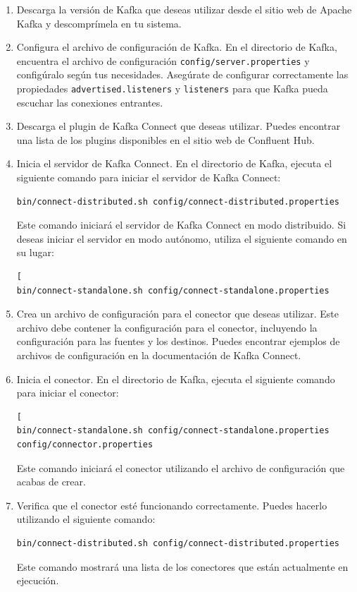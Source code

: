 \documentclass{article}
\begin{document}
\begin{enumerate}
\item Descarga la versión de Kafka que deseas utilizar desde el sitio web de Apache Kafka y descomprímela en tu sistema.
\item Configura el archivo de configuración de Kafka. En el directorio de Kafka, encuentra el archivo de configuración \lstinline{config/server.properties} y configúralo según tus necesidades. Asegúrate de configurar correctamente las propiedades \lstinline{advertised.listeners} y \lstinline{listeners} para que Kafka pueda escuchar las conexiones entrantes.

\item Descarga el plugin de Kafka Connect que deseas utilizar. Puedes encontrar una lista de los plugins disponibles en el sitio web de Confluent Hub.

\item Inicia el servidor de Kafka Connect. En el directorio de Kafka, ejecuta el siguiente comando para iniciar el servidor de Kafka Connect:
\begin{lstlisting}[numbers=none]
bin/connect-distributed.sh config/connect-distributed.properties\end{lstlisting}
Este comando iniciará el servidor de Kafka Connect en modo distribuido. Si deseas iniciar el servidor en modo autónomo, utiliza el siguiente comando en su lugar:
\begin{lstlisting}[numbers=none][
bin/connect-standalone.sh config/connect-standalone.properties\end{lstlisting}
\item Crea un archivo de configuración para el conector que deseas utilizar. Este archivo debe contener la configuración para el conector, incluyendo la configuración para las fuentes y los destinos. Puedes encontrar ejemplos de archivos de configuración en la documentación de Kafka Connect.

\item Inicia el conector. En el directorio de Kafka, ejecuta el siguiente comando para iniciar el conector:
\begin{lstlisting}[numbers=none][
bin/connect-standalone.sh config/connect-standalone.properties config/connector.properties\end{lstlisting}
Este comando iniciará el conector utilizando el archivo de configuración que acabas de crear.

\item Verifica que el conector esté funcionando correctamente. Puedes hacerlo utilizando el siguiente comando:
\begin{lstlisting}[numbers=none]
bin/connect-distributed.sh config/connect-distributed.properties\end{lstlisting}
Este comando mostrará una lista de los conectores que están actualmente en ejecución.
\end{enumerate}
\end{document}

